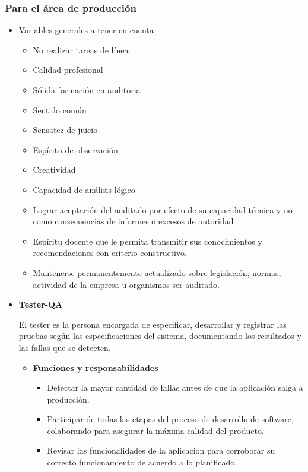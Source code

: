     \subsubsection{Para el área de producción}
          \begin{itemize}
          \item Variables generales a tener en cuenta
              \begin{itemize}
                  \item  No realizar tareas de línea 
                  \item Calidad profesional 
                  \item Sólida formación en auditoria 
                  \item Sentido común 
                  \item Sensatez de juicio 
                  \item Espíritu de observación 
                  \item Creatividad 
                  \item Capacidad de análisis lógico 
                   \item Lograr aceptación del auditado por efecto de su capacidad técnica y no como consecuencias de informes o excesos de autoridad 
                   \item Espíritu docente que le permita transmitir sus conocimientos y recomendaciones con criterio constructivo. 
                   	\item     Mantenerse permanentemente actualizado sobre legislación, normas, actividad de la empresa u organismos  ser auditado.
              \end{itemize}
              
           \item \textbf{Tester-QA         	  }
           
        El tester es la persona encargada de especificar, desarrollar y registrar las pruebas según las especificaciones del sistema, documentando los resultados y las fallas que se detecten.
			\begin{itemize}
			    \item \textbf{Funciones y responsabilidades}
            	
                \begin{itemize}
				    \item Detectar la mayor cantidad de fallas antes de que la aplicación salga a producción.
                    \item Participar de todas las etapas del proceso de desarrollo de software, colaborando para asegurar la máxima calidad del producto.
                    \item Revisar las funcionalidades de la aplicación para corroborar su correcto funcionamiento de acuerdo a lo planificado.
				\end{itemize}
            

\end{itemize}
\end{itemize}

